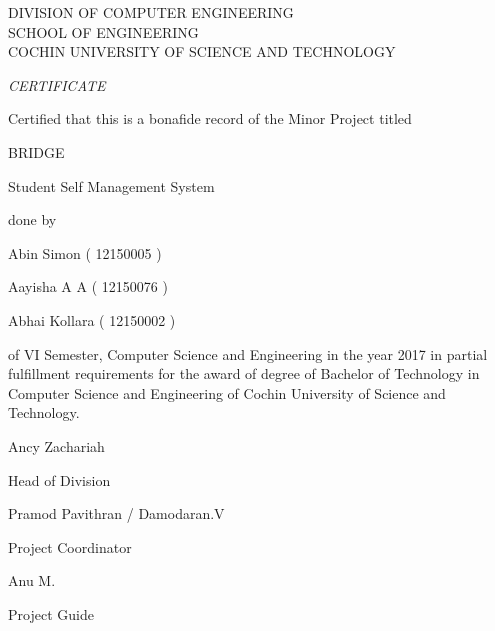 \vspace*{\fill}

\begin{center}

\LARGE
DIVISION OF COMPUTER ENGINEERING\\
SCHOOL OF ENGINEERING\\
COCHIN UNIVERSITY OF SCIENCE AND TECHNOLOGY\\

\hspace{1em}

\huge
\emph{CERTIFICATE}

\hspace{1em}

\large
Certified that this is a bonafide record of the Minor Project titled

\hspace{1em}

\LARGE
BRIDGE

\large
Student Self Management System

\hspace{1em}

done by

\hspace{1em}

\Large
Abin Simon ( 12150005 )

\Large
Aayisha A A ( 12150076 )

\Large
Abhai Kollara ( 12150002 )

\hspace{1em}

\large
of VI Semester, Computer Science and Engineering in the year 2017 in partial fulfillment requirements for the award of degree of Bachelor of Technology in Computer Science and Engineering of Cochin University of Science and Technology.

\hspace{1em}
\vspace{5em}

\begin{minipage}[b]{0.33333\textwidth}
\raggedright
Ancy Zachariah

Head of Division\\
\end{minipage}%
\begin{minipage}[b]{0.33333\textwidth}
\centering
Pramod Pavithran / Damodaran.V

Project Coordinator\\
\end{minipage}%
\begin{minipage}[b]{0.33333\textwidth}
\raggedleft
Anu M.

Project Guide\\
\end{minipage}

\end{center}

\vspace*{\fill}
